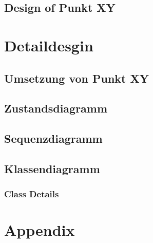 \documentclass[a4paper, 10pt, fleqn]{article}
\begin{document}
		\subsection{Design of Punkt XY}
		
	\clearpage
	\section{Detaildesgin}
		\subsection{Umsetzung von Punkt XY}
		\subsection{Zustandsdiagramm}
		
		\subsection{Sequenzdiagramm}	
		
		\subsection{Klassendiagramm}
			\subsubsection{Class Details}
			
	\clearpage
	\section*{Appendix}
		
\end{document}
